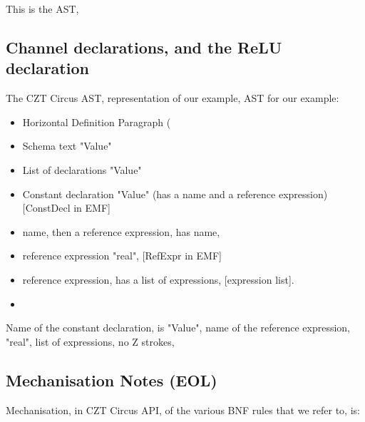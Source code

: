 \documentclass{article}
\begin{document}
This is the AST, 
\subsection{Channel declarations, and the ReLU declaration}
The CZT Circus AST, representation of our example, AST for our example: 

\begin{itemize}
  \item Horizontal Definition Paragraph ( 
  \item Schema text "Value"
  \item List of declarations "Value"
  \item Constant declaration "Value" (has a name and a reference expression) [ConstDecl in EMF]
  \item name, then a reference expression, has name, 
  \item reference expression "real", [RefExpr in EMF]
  \item reference expression, has a list of expressions, [expression list]. 
  \item 
  
\end{itemize}

Name of the constant declaration, is "Value", name of the reference expression, "real", list of expressions, no Z strokes, 

\subsection{Mechanisation Notes (EOL)} 
Mechanisation, in CZT Circus API, of the various BNF rules that we refer to, is: 
\end{document}
